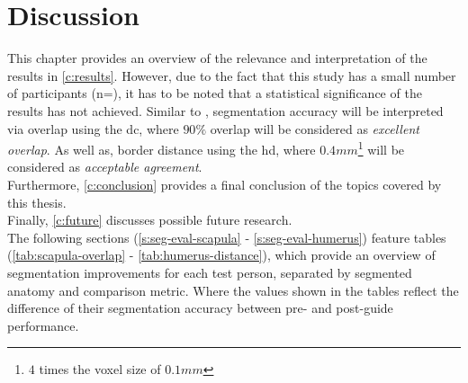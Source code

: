 
\chapter{Discussion}\label{c:discussion}
This chapter provides an overview of the relevance and interpretation of the results in \cref{c:results}.
However, due to the fact that this study has a small number of participants (n=\numberofTesters),
it has to be noted that a statistical significance of the results has not achieved.
Similar to \citeauthor{andersenAccuracyPrecisionManual2018}, segmentation accuracy will be interpreted via overlap using the \acrfull{dc}, where $90\%$ overlap will be considered as \textit{excellent overlap}.
As well as, border distance using the \acrfull{hd}, where $0.4mm$\footnote{$4$ times the voxel size of $0.1mm$} will be considered as \textit{acceptable agreement}.\\
Furthermore, \cref{c:conclusion} provides a final conclusion of the topics covered by this thesis.\\
Finally, \cref{c:future} discusses possible future research.\\

\noindent
The following sections (\cref{s:seg-eval-scapula} - \cref{s:seg-eval-humerus}) feature tables (\cref{tab:scapula-overlap} - \cref{tab:humerus-distance}), which provide an overview of segmentation improvements for each test person, separated by segmented anatomy and comparison metric.
Where the values shown in the tables reflect the difference of their segmentation accuracy between pre- and post-guide performance.


